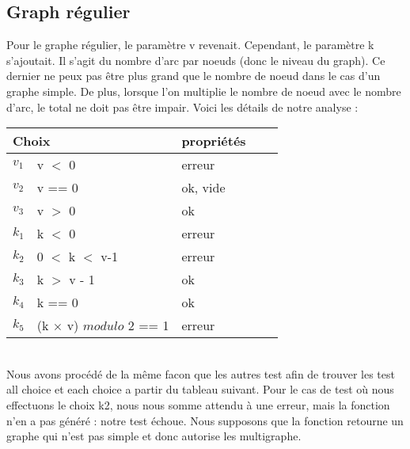 \documentclass[11pt]{article}
\begin{document}
\subsection{Graph régulier}
Pour le graphe régulier, le paramètre v revenait. Cependant, le paramètre k s'ajoutait.
Il s'agit du nombre d'arc par noeuds (donc le niveau du graph).
Ce dernier ne peux pas être plus grand que le nombre de noeud dans le cas d'un graphe simple.
De plus, lorsque l'on multiplie le nombre de noeud avec le nombre d'arc, le total ne doit pas être impair. Voici les détails de notre analyse :
\begin{tabular}{|l|l|l|l|l|}
 \hline
 \multicolumn{2}{|l|}{Choix} & propriétés                                \\ \hline
 $v_1$                       & v $<$ 0                        & erreur   \\ \hline
 $v_2$                       & v == 0                         & ok, vide \\ \hline
 $v_3$                       & v $>$ 0                        & ok       \\ \hline 
 $k_1$                       & k $<$ 0                        & erreur       \\ \hline
 $k_2$                       & 0 $<$ k $<$ v-1                & erreur       \\ \hline \hline
 $k_3$                       & k $>$ v - 1                    & ok   \\ \hline
 $k_4$                       & k == 0                         & ok   \\ \hline
 $k_5$                       & (k $\times$ v) $modulo$ 2 == 1 & erreur   \\ \hline
\end{tabular}
\\
Nous avons procédé de la même facon que les autres test afin de trouver les test all choice et each choice a partir du tableau suivant.
Pour le cas de test où nous effectuons le choix k2, nous nous somme attendu à une erreur, mais la fonction n'en a pas généré : notre test échoue.
Nous supposons que la fonction retourne un graphe qui n'est pas simple et donc autorise les multigraphe.
\end{document}
